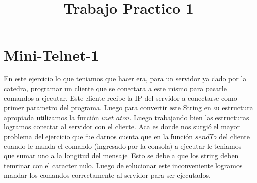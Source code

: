 \documentclass[a4paper, 10pt]{article}
\title{Trabajo Practico 1}
\begin{document}
\maketitle

\newpage

\section{Mini-Telnet-1}
 En este ejercicio lo que teniamos que hacer era, para un servidor ya dado por la catedra, programar un cliente que se conectara a este mismo para pasarle comandos a ejecutar. Este cliente recibe la IP del servidor a conectarse como primer parametro del programa. Luego para convertir este String en su estructura apropiada utilizamos la funci\'on $inet\_aton$. Luego trabajando bien las estructuras logramos conectar al servidor con el cliente. Aca es donde nos surgi\'o el mayor problema del ejercicio que fue darnos cuenta que en la funci\'on $sendTo$ del cliente cuando le manda el comando (ingresado por la consola) a ejecutar le teniamos que sumar uno a la longitud del mensaje. Esto se debe a que los string deben temrinar con el caracter nulo. Luego de solucionar este inconveniente logramos mandar los comandos correctamente al servidor para ser ejecutados.
\end{document}
